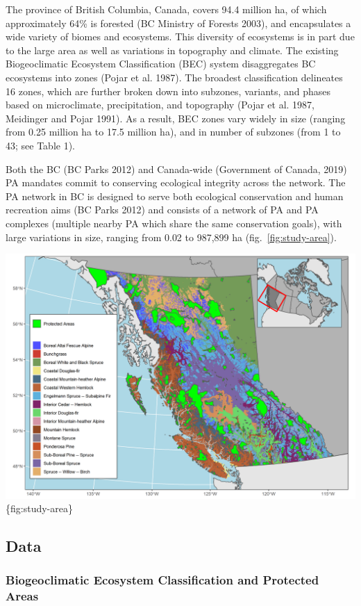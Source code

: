 \documentclass[11pt]{article}
\makeatletter
\def\maxwidth{\ifdim\Gin@nat@width>\linewidth\linewidth
\else\Gin@nat@width\fi}
\let\Oldincludegraphics\includegraphics
\renewcommand{\includegraphics}[1]{\Oldincludegraphics[width=\maxwidth]{#1}}
\makeatother
\begin{document}
The province of British Columbia, Canada, covers 94.4 million ha, of
which approximately 64\% is forested (BC Ministry of Forests 2003), and
encapsulates a wide variety of biomes and ecosystems. This diversity of
ecosystems is in part due to the large area as well as variations in
topography and climate. The existing Biogeoclimatic Ecosystem
Classification (BEC) system disaggregates BC ecosystems into zones
(Pojar et al. 1987). The broadest classification delineates 16 zones,
which are further broken down into subzones, variants, and phases based
on microclimate, precipitation, and topography (Pojar et al. 1987,
Meidinger and Pojar 1991). As a result, BEC zones vary widely in size
(ranging from 0.25 million ha to 17.5 million ha), and in number of
subzones (from 1 to 43; see Table 1).

Both the BC (BC Parks 2012) and Canada-wide (Government of Canada, 2019)
PA mandates commit to conserving ecological integrity across the
network. The PA network in BC is designed to serve both ecological
conservation and human recreation aims (BC Parks 2012) and consists of a
network of PA and PA complexes (multiple nearby PA which share the same
conservation goals), with large variations in size, ranging from 0.02 to
987,899 ha (fig.~\ref{fig:study-area}).

\includegraphics{figures/bec_map.png}\{fig:study-area\}

\hypertarget{data}{%
\subsection{Data}\label{data}}

\hypertarget{biogeoclimatic-ecosystem-classification-and-protected-areas}{%
\subsubsection{Biogeoclimatic Ecosystem Classification and Protected
Areas}\label{biogeoclimatic-ecosystem-classification-and-protected-areas}}
\end{document}
